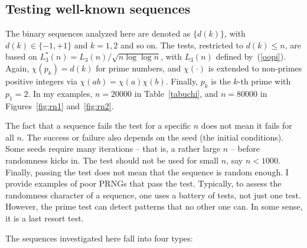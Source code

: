 \documentclass[oneside,10pt]{book}
\begin{document}
\subsection{Testing well-known sequences}\label{twist}

The binary sequences analyzed here are denoted as $\{d(k)\}$, with $d(k)\in\{-1,+1\}$ and $k=1,2$ and so on.
The tests, restricted to $d(k)\leq n$, are based on
$L^*_3(n)=L_3(n)/\sqrt{n\log\log n}$, with  $L_3(n)$ defined by~(\ref{oopi}). Again, $\chi(p_k)=d(k)$ for prime numbers,
and $\chi(\cdot)$ is extended to non-primes positive integers via $\chi(ab)=\chi(a)\chi(b)$. Finally,
 $p_k$ is the $k$-th prime with $p_1=2$. In my examples, $n=\num{20000}$ in Table~\ref{tabuchi}, and $n=\num{80000}$
 in Figures~\ref{fig:rn1} and~\ref{fig:rn2}.

The fact that a sequence fails the test for a specific $n$ does not mean it fails for all $n$. The success or failure also depends on the seed (the initial conditions). Some seeds require many iterations -- that is, a rather large $n$ -- before randomness kicks in. The test should not be used for small $n$, say $n<1000$. Finally, passing the test does not mean that the sequence is random enough. I provide examples of poor PRNGs that pass the test. Typically, to assess the randomness character of a sequence, one uses a battery of tests, not just one test. However, the prime test can detect patterns that no other one can. In some sense, it is a last resort test.

\noindent The sequences investigated here fall into four types:
\end{document}
